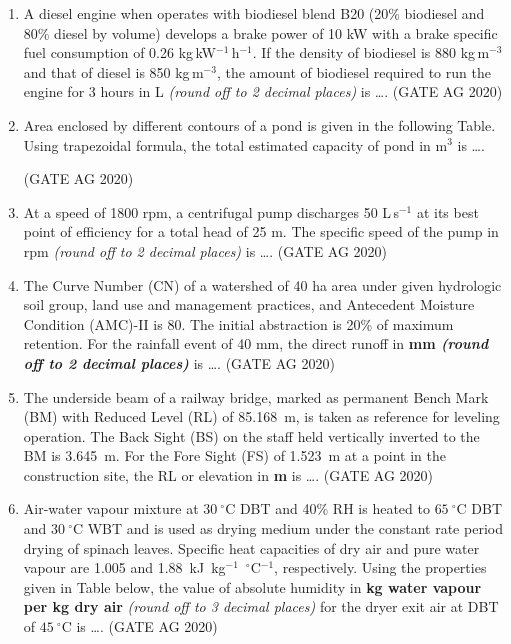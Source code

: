 \documentclass[journal]{IEEEtran}
\begin{document}
\begin{enumerate}
\item
A diesel engine when operates with biodiesel blend B20 (20\% biodiesel and 80\% diesel by volume) develops a brake power of 10 kW with a brake specific fuel consumption of 0.26 kg\,kW$^{-1}$\,h$^{-1}$. If the density of biodiesel is 880 kg\,m$^{-3}$ and that of diesel is 850 kg\,m$^{-3}$, the amount of biodiesel required to run the engine for 3 hours in L \textit{(round off to 2 decimal places)} is \dots.
\hfill(GATE AG 2020)\\

\medskip

\item
Area enclosed by different contours of a pond is given in the following Table. Using trapezoidal formula, the total estimated capacity of pond in m$^3$ is \dots.


\hfill(GATE AG 2020)\\

\medskip


\item
At a speed of 1800 rpm, a centrifugal pump discharges 50 L\,s$^{-1}$ at its best point of efficiency for a total head of 25 m. The specific speed of the pump in rpm \textit{(round off to 2 decimal places)} is \dots.
\hfill(GATE AG 2020)\\

\medskip

\item
The Curve Number (CN) of a watershed of 40 ha area under given hydrologic soil group, land use and management practices, and Antecedent Moisture Condition (AMC)-II is 80. The initial abstraction is 20\% of maximum retention. For the rainfall event of 40 mm, the direct runoff in \textbf{mm \textit{(round off to 2 decimal places)}} is \dots.
\hfill(GATE AG 2020)\\

\medskip

\item
The underside beam of a railway bridge, marked as permanent Bench Mark (BM) with Reduced Level (RL) of 85.168~m, is taken as reference for leveling operation. The Back Sight (BS) on the staff held vertically inverted to the BM is 3.645~m. For the Fore Sight (FS) of 1.523~m at a point in the construction site, the RL or elevation in \textbf{m} is \dots. 
\hfill(GATE AG 2020)\\

\medskip

\item
Air-water vapour mixture at $30~^\circ$C DBT and 40\% RH is heated to $65~^\circ$C DBT and $30~^\circ$C WBT and is used as drying medium under the constant rate period drying of spinach leaves. Specific heat capacities of dry air and pure water vapour are 1.005 and 1.88~kJ~kg$^{-1}$~$^\circ$C$^{-1}$, respectively. Using the properties given in Table below, the value of absolute humidity in \textbf{kg water vapour per kg dry air} \textit{(round off to 3 decimal places)} for the dryer exit air at DBT of $45~^\circ$C is \dots.
\hfill(GATE AG 2020)\\


\end{enumerate}
\end{document}
